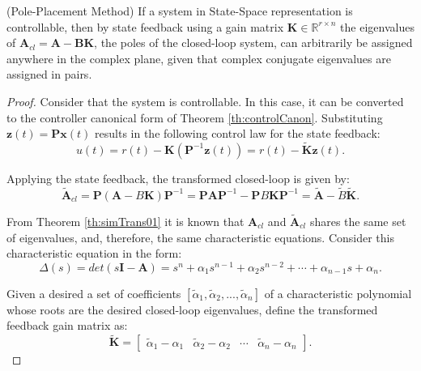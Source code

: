 \documentclass[a4paper,11pt]{book}
\numberwithin{figure}{chapter}
\numberwithin{equation}{chapter}
\numberwithin{table}{chapter}
\newtheorem{theorem}{Theorem}[chapter]
\theoremstyle{definition}
\newcounter{boxed-theorem}
\newenvironment{boxed-theorem}[1]
{\begin{shaded} \begin{theorem}{#1}}
{\end{theorem} \end{shaded}}
\newcounter{boxed-definition}
\begin{document}
\begin{boxed-theorem}{(Pole-Placement Method)} \label{th:polePlace}
    If a system in State-Space representation is controllable, then by state feedback using a gain matrix $\bm{K} \in \mathbb{R}^{r \times n}$ the eigenvalues of $\bm{A}_{cl}=\bm{A}-\bm{B}\bm{K}$, the poles of the closed-loop system, can arbitrarily be assigned anywhere in the complex plane, given that complex conjugate eigenvalues are assigned in pairs.
\end{boxed-theorem} 

\begin{proof}
    Consider that the system is controllable. In this case, it can be converted to the controller canonical form of Theorem \ref{th:controlCanon}. Substituting $\bm{z}(t) = \bm{P} \bm{x}(t)$ results in the following control law for the state feedback:
    \begin{equation}
        u(t) = r(t) - \bm{K} \left( \bm{P}^{-1} \bm{z}(t) \right) = r(t) - \tilde{\bm{K}} \bm{z}(t)
    .\end{equation}
    
    Applying the state feedback, the transformed closed-loop is given by:
    \begin{equation} \label{eq:fdbckContrCanon}
    \tilde{\bm{A}}_{cl} = \bm{P} (\bm{A} - B \bm{K}) \bm{P}^{-1} = \bm{P} \bm{A} \bm{P}^{-1} - \bm{P} B \bm{K} \bm{P}^{-1} = \tilde{\bm{A}} - \tilde{B} \tilde{\bm{K}}
    .\end{equation}   
    
    From Theorem \ref{th:simTrans01} it is known that $\bm{A}_{cl}$ and $\tilde{\bm{A}}_{cl}$ shares the same set of eigenvalues, and, therefore, the same characteristic equations. Consider this characteristic equation in the form:
    \begin{equation}
        \Delta(s) = det(s\bm{I} - \bm{A}) = s^n + \alpha_1 s^{n-1} + \alpha_2 s^{n-2} + \cdots + \alpha_{n-1} s + \alpha_n
    .\end{equation}
    
    Given a desired a set of coefficients $[\tilde{\alpha}_1, \tilde{\alpha}_2, ..., \tilde{\alpha}_n]$ of a characteristic polynomial whose roots are the desired closed-loop eigenvalues, define the transformed feedback gain matrix as:
    \begin{equation}
        \tilde{\bm{K}} = \begin{bmatrix} \tilde{\alpha}_1 - \alpha_1 & \tilde{\alpha}_2 - \alpha_2 & \cdots & \tilde{\alpha}_n - \alpha_n \end{bmatrix}
    .\end{equation}
    

\end{proof}
\end{document}
